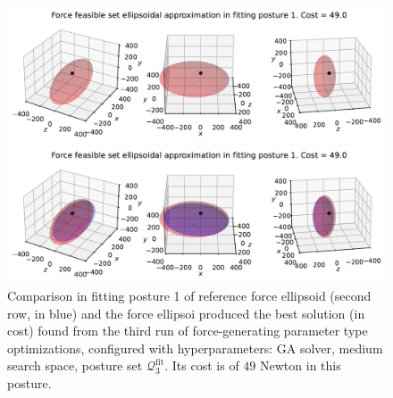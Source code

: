 \clearpage
\begin{figure}[!htb]
    \centering
    \captionsetup{justification=centering}
    
    \begin{minipage}{0.8\linewidth}
        \captionsetup{justification=centering}
        \centering
        \includegraphics[trim={0 0 0 0}, clip, width=1\linewidth]{img/chapter_4/reconstruction_stanford_imgs/ellipsoid_genetic_p3_force_medium_output_3214991_trial_3_fitting_posture_1.pdf}
    \end{minipage}
    \begin{minipage}{0.8\linewidth}
        \captionsetup{justification=centering}
        \centering
        \includegraphics[trim={0 0 0 20}, clip, width=1\linewidth]{img/chapter_4/reconstruction_stanford_imgs/ellipsoid_genetic_p3_force_medium_output_3214991_trial_3_fitting_posture_1_with_stanford.pdf}
    \end{minipage}
    \caption{Comparison in fitting posture 1 of reference force ellipsoid (second row, in blue) and the force ellipsoi produced the best solution (in cost) found from the third run of force-generating parameter type optimizations, configured with hyperparameters: GA solver, medium search space, posture set $\mathcal{Q}_3^{\text{fit}}$. Its cost is of $49$ Newton in this posture.}
    \label{fig:ellipsoid_genetic_p3_force_medium_output_3214991_trial_3_fitting_posture_1}
\end{figure}


